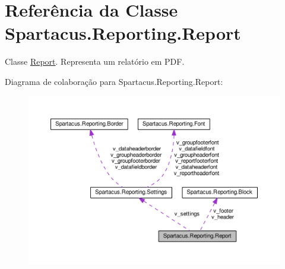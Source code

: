 \hypertarget{classSpartacus_1_1Reporting_1_1Report}{\section{Referência da Classe Spartacus.\+Reporting.\+Report}
\label{classSpartacus_1_1Reporting_1_1Report}
}


Classe \hyperlink{classSpartacus_1_1Reporting_1_1Report}{Report}. Representa um relatório em P\+D\+F.  




Diagrama de colaboração para Spartacus.\+Reporting.\+Report\+:
\nopagebreak
\begin{figure}[H]
\begin{center}
\leavevmode
\includegraphics[width=350pt]{classSpartacus_1_1Reporting_1_1Report__coll__graph}
\end{center}
\end{figure}
